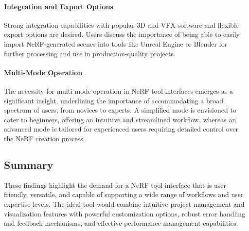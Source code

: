 \paragraph{Integration and Export Options}
Strong integration capabilities with popular 3D and VFX software and flexible export options are desired. 
Users discuss the importance of being able to easily import NeRF-generated scenes into tools like Unreal Engine \cite{noauthor_unreal_nodate} or Blender \cite{noauthor_blender_nodate} for further processing and use in production-quality projects​​.
\cite{P1, P2, P4}

\paragraph{Multi-Mode Operation}
The necessity for multi-mode operation in NeRF tool interfaces emerges as a significant insight, underlining the importance of accommodating a broad spectrum of users, from novices to experts. 
A simplified mode is envisioned to cater to beginners, offering an intuitive and streamlined workflow, whereas an advanced mode is tailored for experienced users requiring detailed control over the NeRF creation process. 
\cite{P1, P2, P3, P4}


\subsection*{Summary}

These findings highlight the demand for a NeRF tool interface that is user-friendly, versatile, and capable of supporting a wide range of workflows and user expertise levels. 
The ideal tool would combine intuitive project management and visualization features with powerful customization options, robust error handling and feedback mechanisms, and effective performance management capabilities.
